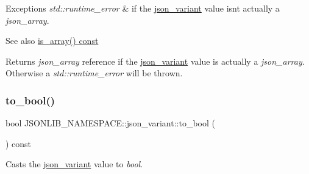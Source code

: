 \begin{DoxyExceptions}{Exceptions}
{\em std\+::runtime\+\_\+error} & if the \hyperlink{classJSONLIB__NAMESPACE_1_1json__variant}{json\+\_\+variant} value isn\textquotesingle{}t actually a {\itshape json\+\_\+array}. \\
\hline
\end{DoxyExceptions}
\begin{DoxySeeAlso}{See also}
\hyperlink{classJSONLIB__NAMESPACE_1_1json__variant_a72349dff71a411ac24eea6d943772df7}{is\+\_\+array() const} 
\end{DoxySeeAlso}
\begin{DoxyReturn}{Returns}
{\itshape json\+\_\+array} reference if the \hyperlink{classJSONLIB__NAMESPACE_1_1json__variant}{json\+\_\+variant} value is actually a {\itshape json\+\_\+array}. Otherwise a {\itshape std\+::runtime\+\_\+error} will be thrown. 
\end{DoxyReturn}
\mbox{\label{classJSONLIB__NAMESPACE_1_1json__variant_a7a675f60b84c0f8e6ee30aba7cb0b72c}} 
\subsubsection{\texorpdfstring{to\+\_\+bool()}{to\_bool()}\hspace{0.1cm}{\footnotesize\ttfamily [1/2]}}
{\footnotesize\ttfamily bool J\+S\+O\+N\+L\+I\+B\+\_\+\+N\+A\+M\+E\+S\+P\+A\+C\+E\+::json\+\_\+variant\+::to\+\_\+bool (\begin{DoxyParamCaption}{ }\end{DoxyParamCaption}) const}



Casts the \hyperlink{classJSONLIB__NAMESPACE_1_1json__variant}{json\+\_\+variant} value to {\itshape bool}. 


